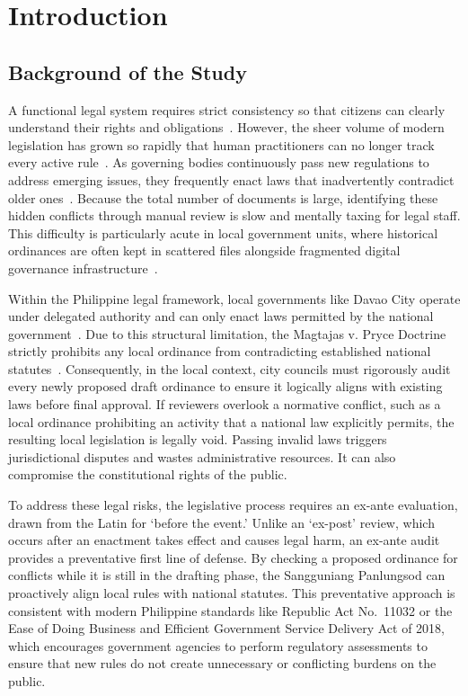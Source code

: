 \chapter{Introduction}
\section{Background of the Study}
A functional legal system requires strict consistency so that citizens can clearly understand their rights and obligations~\cite{fuller1964the}. However, the sheer volume of modern legislation has grown so rapidly that human practitioners can no longer track every active rule~\cite{ruhl2015measuring, chalkidis2022lexglue}. As governing bodies continuously pass new regulations to address emerging issues, they frequently enact laws that inadvertently contradict older ones~\cite{sartor2005legal, kelsen1967pure}. Because the total number of documents is large, identifying these hidden conflicts through manual review is slow and mentally taxing for legal staff. This difficulty is particularly acute in local government units, where historical ordinances are often kept in scattered files alongside fragmented digital governance infrastructure~\cite{conchas2025digital}.

Within the Philippine legal framework, local governments like Davao City operate under delegated authority and can only enact laws permitted by the national government~\cite{philgov1991ra7160}. Due to this structural limitation, the Magtajas v. Pryce Doctrine strictly prohibits any local ordinance from contradicting established national statutes~\cite{scp1994magtajasvpryce}. Consequently, in the local context, city councils must rigorously audit every newly proposed draft ordinance to ensure it logically aligns with existing laws before final approval. If reviewers overlook a normative conflict, such as a local ordinance prohibiting an activity that a national law explicitly permits, the resulting local legislation is legally void. Passing invalid laws triggers jurisdictional disputes and wastes administrative resources. It can also compromise the constitutional rights of the public.

To address these legal risks, the legislative process requires an ex-ante evaluation, drawn from the Latin for `before the event.' Unlike an `ex-post' review, which occurs after an enactment takes effect and causes legal harm, an ex-ante audit provides a preventative first line of defense. By checking a proposed ordinance for conflicts while it is still in the drafting phase, the Sangguniang Panlungsod can proactively align local rules with national statutes. This preventative approach is consistent with modern Philippine standards like Republic Act No.~11032 or the Ease of Doing Business and Efficient Government Service Delivery Act of 2018, which encourages government agencies to perform regulatory assessments to ensure that new rules do not create unnecessary or conflicting burdens on the public.

